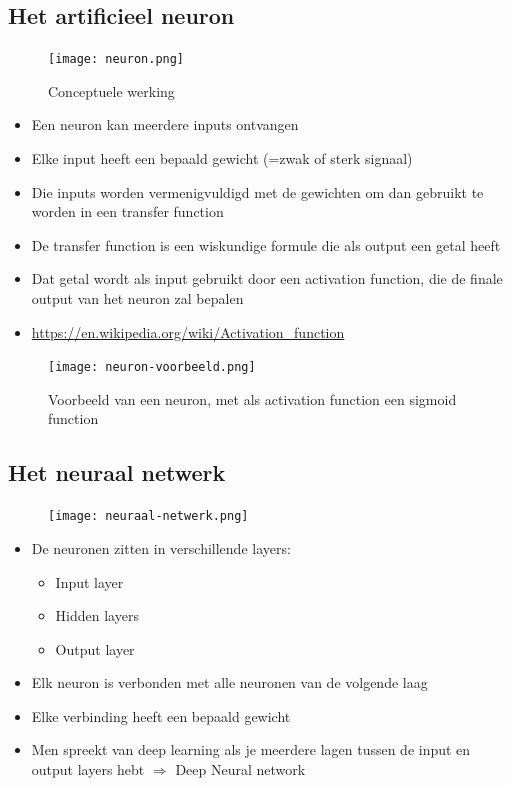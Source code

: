 \documentclass{article}
\begin{document}
\subsection{Het artificieel neuron}

\begin{figure}[H]
    \centering
    \texttt{[image: neuron.png]}
    \caption{Conceptuele werking}
\end{figure}

\begin{itemize}
    \item Een neuron kan meerdere inputs ontvangen
    \item Elke input heeft een bepaald gewicht (=zwak of sterk signaal)
    \item Die inputs worden vermenigvuldigd met de gewichten om dan gebruikt te worden in een transfer function
    \item De transfer function is een wiskundige formule die als output een getal heeft
    \item Dat getal wordt als input gebruikt door een activation function, die de finale output van het neuron zal bepalen
    \item \url{https://en.wikipedia.org/wiki/Activation_function}
\end{itemize}

\begin{figure}[H]
    \centering
    \texttt{[image: neuron-voorbeeld.png]}
    \caption{Voorbeeld van een neuron, met als activation function een sigmoid function}
\end{figure}

\subsection{Het neuraal netwerk}

\begin{figure}[H]
    \centering
    \texttt{[image: neuraal-netwerk.png]}
\end{figure}

\begin{itemize}
    \item De neuronen zitten in verschillende layers:
    \begin{itemize}
        \item Input layer
        \item Hidden layers
        \item Output layer
    \end{itemize}
    \item Elk neuron is verbonden met alle neuronen van de volgende laag
    \item Elke verbinding heeft een bepaald gewicht
    \item Men spreekt van deep learning als je meerdere lagen tussen de input en output layers hebt $\Rightarrow$ Deep Neural network
\end{itemize}
\end{document}
